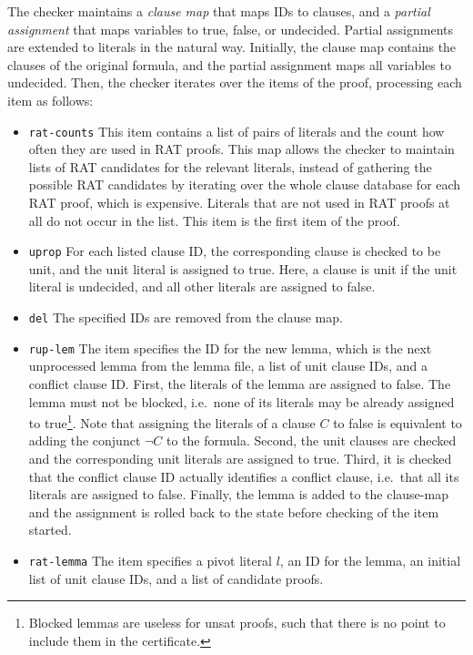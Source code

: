 \documentclass[conference]{IEEEtran}
\begin{document}
The checker maintains a \emph{clause map} that maps IDs to clauses, and a \emph{partial assignment} that maps variables to true, false, or undecided.
Partial assignments are extended to literals in the natural way.
Initially, the clause map contains the clauses of the original formula, and the partial assignment maps all variables to undecided.
Then, the checker iterates over the items of the proof, processing each item as follows:
\begin{itemize}
  \item {\tt rat-counts} This item contains a list of pairs of literals and the count how often they are used in RAT proofs.
      This map allows the checker to maintain lists of RAT candidates for the relevant literals, instead of gathering the
      possible RAT candidates by iterating over the whole clause database for each RAT proof, which is expensive.
      Literals that are not used in RAT proofs at all do not occur in the list. This item is the first item of the proof.
  \item {\tt uprop}
    For each listed clause ID, the corresponding clause is checked to be unit, and the unit literal is assigned to true.
    Here, a clause is unit if the unit literal is undecided, and all other literals are assigned to false.
  \item {\tt del} The specified IDs are removed from the clause map.
  \item {\tt rup-lem} The item specifies the ID for the new lemma, which is the next unprocessed lemma from the lemma file, a list of unit clause IDs, and a conflict clause ID.
      First, the literals of the lemma are assigned to false. The lemma must not be blocked, i.e.\ none of its literals may be already assigned to true\footnote{Blocked lemmas are useless for unsat proofs, such that there is no point to include them in the certificate.}.
        Note that assigning the literals of a clause $C$ to false is equivalent to adding the conjunct $\neg C$ to the formula.
      Second, the unit clauses are checked and the corresponding unit literals are assigned to true.
      Third, it is checked that the conflict clause ID actually identifies a conflict clause, i.e.\ that all its literals are assigned to false.
      Finally, the lemma is added to the clause-map and the assignment is rolled back to the state before checking of the item started.
  \item {\tt rat-lemma} The item specifies a pivot literal $l$, an ID for the lemma, an initial list of unit clause IDs, and a list of
      candidate proofs.

\end{itemize}
\end{document}
